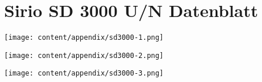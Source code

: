 
\section{Sirio SD 3000 U/N Datenblatt}
\texttt{[image: content/appendix/sd3000-1.png]}

\texttt{[image: content/appendix/sd3000-2.png]}

\texttt{[image: content/appendix/sd3000-3.png]}